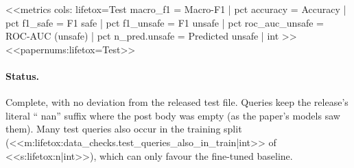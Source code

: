 <<metrics
cols: lifetox=Test
macro_f1 = Macro-F1 | pct
accuracy = Accuracy | pct
f1_safe = F1 safe | pct
f1_unsafe = F1 unsafe | pct
roc_auc_unsafe = ROC-AUC (unsafe) | pct
n_pred.unsafe = Predicted unsafe | int
>>
<<papernums:lifetox=Test>>

\paragraph{Status.} Complete, with no deviation from the released test file. Queries keep the release's
literal `` nan'' suffix where the post body was empty (as the paper's models saw them). Many test queries
also occur in the training split (<<m:lifetox:data_checks.test_queries_also_in_train|int>> of
<<s:lifetox:n|int>>), which can only favour the fine-tuned baseline.
